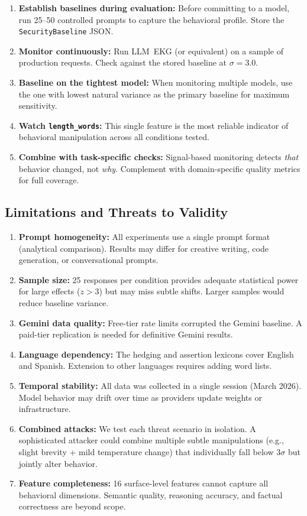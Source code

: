 \documentclass[11pt,twocolumn]{article}
\begin{document}
\begin{enumerate}[nosep]
    \item \textbf{Establish baselines during evaluation:} Before committing to a model, run 25--50 controlled prompts to capture the behavioral profile. Store the \texttt{SecurityBaseline} JSON.
    \item \textbf{Monitor continuously:} Run LLM~EKG (or equivalent) on a sample of production requests. Check against the stored baseline at $\sigma = 3.0$.
    \item \textbf{Baseline on the tightest model:} When monitoring multiple models, use the one with lowest natural variance as the primary baseline for maximum sensitivity.
    \item \textbf{Watch \texttt{length\_words}:} This single feature is the most reliable indicator of behavioral manipulation across all conditions tested.
    \item \textbf{Combine with task-specific checks:} Signal-based monitoring detects \emph{that} behavior changed, not \emph{why}. Complement with domain-specific quality metrics for full coverage.
\end{enumerate}

\subsection{Limitations and Threats to Validity}

\begin{enumerate}[nosep]
    \item \textbf{Prompt homogeneity:} All experiments use a single prompt format (analytical comparison). Results may differ for creative writing, code generation, or conversational prompts.
    \item \textbf{Sample size:} 25 responses per condition provides adequate statistical power for large effects ($z > 3$) but may miss subtle shifts. Larger samples would reduce baseline variance.
    \item \textbf{Gemini data quality:} Free-tier rate limits corrupted the Gemini baseline. A paid-tier replication is needed for definitive Gemini results.
    \item \textbf{Language dependency:} The hedging and assertion lexicons cover English and Spanish. Extension to other languages requires adding word lists.
    \item \textbf{Temporal stability:} All data was collected in a single session (March 2026). Model behavior may drift over time as providers update weights or infrastructure.
    \item \textbf{Combined attacks:} We test each threat scenario in isolation. A sophisticated attacker could combine multiple subtle manipulations (e.g., slight brevity + mild temperature change) that individually fall below $3\sigma$ but jointly alter behavior.
    \item \textbf{Feature completeness:} 16 surface-level features cannot capture all behavioral dimensions. Semantic quality, reasoning accuracy, and factual correctness are beyond scope.
\end{enumerate}
\end{document}
